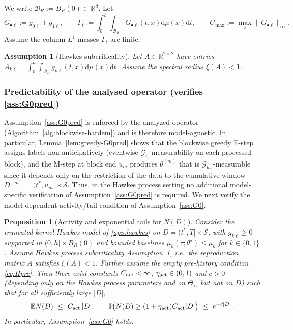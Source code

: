 \documentclass{statsoc}
\newtheorem{proposition}[proposition]{Proposition}
\newtheorem{assumption}[assumption]{Assumption}
\newcommand{\bbE}{\mathbb{E}}
\newcommand{\bbP}{\mathbb{P}}
\newcommand{\dd}{\mathrm{d}}
\newcommand{\bbR}{\mathbb{R}}
\newcommand{\1}{\mathbbm{1}}
\begin{document}
We write \(\mathcal B_R:=B_R(0)\subset\bbR^d\). Let
\[
G_{\bullet\ell}:=g_{0\ell}+g_{1\ell},\qquad
\Gamma_\ell:=\int_0^h\!\!\int_{\mathcal B_R} G_{\bullet\ell}(t,x) \dd\mu(x)\dd t,\qquad
G_{\max}:=\max_\ell \|G_{\bullet\ell}\|_\infty.
\]
Assume the column $L^1$ masses $\Gamma_\ell$ are finite.

\begin{assumption}[Hawkes subcriticality]\label{ass:H-stab}
Let $A\in\bbR^{2\times 2}$ have entries $A_{k\ell}=\int_0^h\!\!\int_{\mathcal B_R} g_{k\ell}(t,x) \dd\mu(x)\dd t$. Assume the spectral radius $\xi(A)<1$.
\end{assumption}

\subsubsection{Predictability of the analysed operator (verifies \cref{ass:G0pred})}

Assumption~\ref{ass:G0pred} is enforced by the analyzed operator (Algorithm~\ref{alg:blockwise-hardem}) and is therefore model-agnostic.
In particular, Lemma~\ref{lem:greedy-G0pred} shows that the blockwise greedy E-step assigns labels non-anticipatively (eventwise $\mathcal G_{t_i}$-measurability on each processed block), and the M-step at block end $u_m$ produces $\theta^{(m)}$ that is $\mathcal G_{u_m}$-measurable since it depends only on the restriction of the data to the cumulative window $D^{(m)}=(t^\ast,u_m]\times\mathcal S$.
Thus, in the Hawkes process setting no additional model-specific verification of Assumption~\ref{ass:G0pred} is required.
We next verify the model-dependent activity/tail condition of Assumption~\ref{ass:G0}.

\begin{proposition}[Activity and exponential tails for $N(D)$]
\label{prop:hawkes-G0}
Consider the truncated kernel Hawkes model of \cref{app:hawkes} on $D=(t^\ast,T]\times \mathcal{S}$, with $g_{k\ell}\ge 0$ supported in $(0,h]\times B_R(0)$ and bounded baselines $\mu_k(\tau;\theta^\star)\le \overline\mu_k$ for $k\in\{0,1\}$. Assume Hawkes process subcriticality Assumption~\ref{ass:H-stab}, i.e.\ the reproduction matrix $A$ satisfies $\xi(A)<1$. Further assume the empty pre-history condition \eqref{eq:Hpre}. Then there exist constants $C_{\rm act}<\infty$, $\eta_{\rm act}\in(0,1)$ and $c>0$ (depending only on the Hawkes process parameters and on $\Theta_\circ$, but not on $D$) such that for all sufficiently large $|D|$,
\[
\bbE N(D)\ \le\ C_{\rm act}\,|D|,
\qquad
\bbP\!\big(N(D)\ge (1+\eta_{\rm act})C_{\rm act}|D|\big)\ \le\ e^{-c|D|}.
\]
In particular, Assumption~\ref{ass:G0} holds.
\end{proposition}
\end{document}
